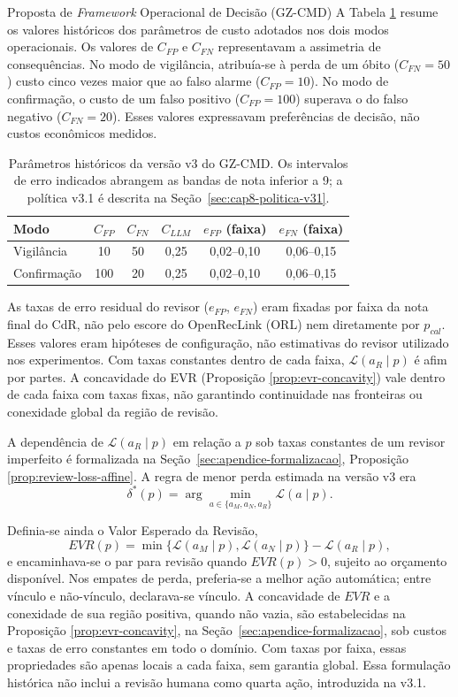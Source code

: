 \begin{chapter}{Proposta de \textit{Framework} Operacional de Decisão (GZ-CMD)}
A Tabela \ref{tab:cap8-custos} resume os valores históricos dos parâmetros de custo adotados nos dois modos operacionais. Os valores de $C_{FP}$ e $C_{FN}$ representavam a assimetria de consequências. No modo de vigilância, atribuía-se à perda de um óbito ($C_{FN}=50$) custo cinco vezes maior que ao falso alarme ($C_{FP}=10$). No modo de confirmação, o custo de um falso positivo ($C_{FP}=100$) superava o do falso negativo ($C_{FN}=20$). Esses valores expressavam preferências de decisão, não custos econômicos medidos.

\begin{table}[!ht]
\centering
\caption{Parâmetros históricos da versão v3 do GZ-CMD. Os intervalos de erro indicados abrangem as bandas de nota inferior a 9; a política v3.1 é descrita na Seção~\ref{sec:cap8-politica-v31}.}
\label{tab:cap8-custos}
\begin{tabular}{|l|c|c|c|c|c|}
\hline
Modo & $C_{FP}$ & $C_{FN}$ & $C_{LLM}$ & $e_{FP}$ (faixa) & $e_{FN}$ (faixa) \\
\hline
Vigilância & 10 & 50 & 0,25 & 0,02--0,10 & 0,06--0,15 \\
\hline
Confirmação & 100 & 20 & 0,25 & 0,02--0,10 & 0,06--0,15 \\
\hline
\end{tabular}
\end{table}

As taxas de erro residual do revisor ($e_{FP}$, $e_{FN}$) eram fixadas por faixa da nota final do CdR, não pelo escore do OpenRecLink (ORL) nem diretamente por $p_{cal}$. Esses valores eram hipóteses de configuração, não estimativas do revisor utilizado nos experimentos. Com taxas constantes dentro de cada faixa, $\mathcal{L}(a_R\mid p)$ é afim por partes. A concavidade do EVR (Proposição \ref{prop:evr-concavity}) vale dentro de cada faixa com taxas fixas, não garantindo continuidade nas fronteiras ou conexidade global da região de revisão.

A dependência de $\mathcal{L}(a_R\mid p)$ em relação a $p$ sob taxas constantes de um revisor imperfeito é formalizada na Seção~\ref{sec:apendice-formalizacao}, Proposição \ref{prop:review-loss-affine}. A regra de menor perda estimada na versão v3 era
\[
\delta^*(p)=\arg\min_{a\in\{a_M,a_N,a_R\}}\mathcal{L}(a\mid p).
\]

Definia-se ainda o Valor Esperado da Revisão,
\[
EVR(p)=\min\{\mathcal{L}(a_M\mid p),\mathcal{L}(a_N\mid p)\}-\mathcal{L}(a_R\mid p),
\]
e encaminhava-se o par para revisão quando $EVR(p)>0$, sujeito ao orçamento disponível. Nos empates de perda, preferia-se a melhor ação automática; entre vínculo e não-vínculo, declarava-se vínculo. A concavidade de $EVR$ e a conexidade de sua região positiva, quando não vazia, são estabelecidas na Proposição \ref{prop:evr-concavity}, na Seção~\ref{sec:apendice-formalizacao}, sob custos e taxas de erro constantes em todo o domínio. Com taxas por faixa, essas propriedades são apenas locais a cada faixa, sem garantia global. Essa formulação histórica não inclui a revisão humana como quarta ação, introduzida na v3.1.


\end{chapter}
